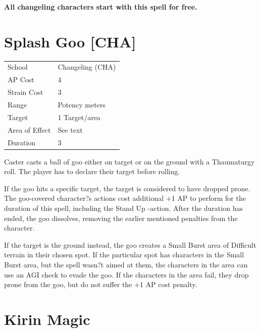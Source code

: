 \documentclass[11pt,a4paper,twocolumn]{book}
\begin{document}
	\textbf{All changeling characters start with this spell for free.}
	
	\vfill
	
	\pagebreak

		\section*{Splash Goo [CHA]}
	{
		\begin{tabu} to 75mm{| X[l,4] | X[l,7] |}
			\hline
			School 			&  Changeling (CHA)\\
			AP Cost	      	&  4				\\
			Strain Cost     &  3				\\
			Range     		&  Potency meters	\\
			Target      	&  1 Target/area	\\
			Area of Effect  &  See text	 		\\
			Duration     	&  3				\\ \hline
		\end{tabu}
		
	}
	
	\medskip
	
	Caster casts a ball of goo either on target or on the ground with a Thaumaturgy roll. The player has to declare their target before rolling.
	
	If the goo hits a specific target, the target is considered to have dropped prone. The goo-covered character?s actions cost additional +1 AP to perform for the duration of this spell, including the Stand Up -action. After the duration has ended, the goo dissolves, removing the earlier mentioned penalties from the character.
	
	If the target is the ground instead, the goo creates a Small Burst area of Difficult terrain in their chosen spot. If the particular spot has characters in the Small Burst area, but the spell wasn?t aimed at them, the characters in the area can use an AGI check to evade the goo. If the characters in the area fail, they drop prone from the goo, but do not suffer the +1 AP cost penalty.
	
	\vfill
	
	\pagebreak
	
	\section*{Kirin Magic}
	
\end{document}
